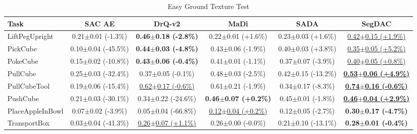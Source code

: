 \begin{table}[htbp]
\centering
\scriptsize
\caption{Easy Ground Texture Test}
\label{tab:appendix_groundtexturetest_easy}
\begin{adjustbox}{max width=\textwidth}
\begin{tabular}{l*{5}{c}}
\toprule
\textbf{Task} & \textbf{SAC AE} & \textbf{DrQ-v2} & \textbf{MaDi} & \textbf{SADA} & \textbf{SegDAC} \\
\midrule
LiftPegUpright & 0.21$\pm$0.01 \scriptsize{(-1.3\%)} & \textbf{0.46$\pm$0.18 \scriptsize{(-2.8\%)}} & 0.22$\pm$0.01 \scriptsize{(+1.6\%)} & 0.23$\pm$0.03 \scriptsize{(+1.6\%)} & \underline{0.42$\pm$0.15 \scriptsize{(+1.9\%)}} \\
PickCube & 0.10$\pm$0.04 \scriptsize{(-45.5\%)} & \textbf{0.44$\pm$0.03 \scriptsize{(-4.8\%)}} & 0.43$\pm$0.06 \scriptsize{(-1.9\%)} & 0.40$\pm$0.03 \scriptsize{(+3.8\%)} & \underline{0.35$\pm$0.05 \scriptsize{(+5.2\%)}} \\
PokeCube & 0.15$\pm$0.02 \scriptsize{(-10.8\%)} & \textbf{0.43$\pm$0.06 \scriptsize{(-0.4\%)}} & 0.41$\pm$0.01 \scriptsize{(-1.1\%)} & 0.37$\pm$0.07 \scriptsize{(-3.9\%)} & \underline{0.40$\pm$0.05 \scriptsize{(+0.8\%)}} \\
PullCube & 0.25$\pm$0.03 \scriptsize{(-32.4\%)} & 0.37$\pm$0.05 \scriptsize{(-0.1\%)} & 0.48$\pm$0.03 \scriptsize{(-2.5\%)} & 0.42$\pm$0.15 \scriptsize{(-13.2\%)} & \textbf{\underline{0.53$\pm$0.06 \scriptsize{(+4.9\%)}}} \\
PullCubeTool & 0.19$\pm$0.06 \scriptsize{(-15.4\%)} & \underline{0.62$\pm$0.17 \scriptsize{(-0.6\%)}} & 0.61$\pm$0.21 \scriptsize{(-1.9\%)} & 0.34$\pm$0.17 \scriptsize{(-8.3\%)} & \textbf{\underline{0.74$\pm$0.16 \scriptsize{(-0.6\%)}}} \\
PushCube & 0.21$\pm$0.03 \scriptsize{(-30.1\%)} & 0.34$\pm$0.22 \scriptsize{(-24.6\%)} & \textbf{0.46$\pm$0.07 \scriptsize{(+0.2\%)}} & 0.45$\pm$0.01 \scriptsize{(-1.8\%)} & \textbf{\underline{0.46$\pm$0.04 \scriptsize{(+2.9\%)}}} \\
PlaceAppleInBowl & 0.07$\pm$0.02 \scriptsize{(-3.9\%)} & 0.05$\pm$0.04 \scriptsize{(-66.8\%)} & \underline{0.12$\pm$0.04 \scriptsize{(+0.2\%)}} & 0.12$\pm$0.05 \scriptsize{(-2.7\%)} & \textbf{0.30$\pm$0.17 \scriptsize{(-4.7\%)}} \\
TransportBox & 0.03$\pm$0.04 \scriptsize{(-41.3\%)} & \underline{0.26$\pm$0.07 \scriptsize{(+1.1\%)}} & 0.26$\pm$0.00 \scriptsize{(-0.0\%)} & 0.21$\pm$0.10 \scriptsize{(-13.1\%)} & \textbf{0.28$\pm$0.01 \scriptsize{(-0.4\%)}} \\
\bottomrule
\end{tabular}
\end{adjustbox}
\end{table}

